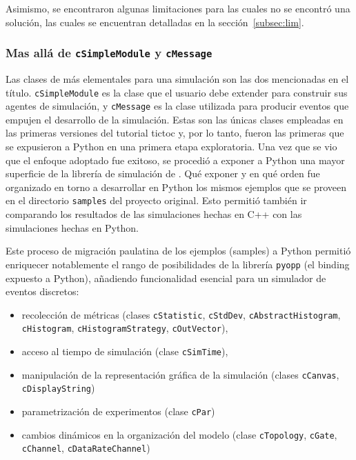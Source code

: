 \documentclass[]{article}
\begin{document}
Asimismo, se encontraron algunas limitaciones para las cuales no se encontró
una solución, las cuales se encuentran detalladas en la
sección~\ref{subsec:lim}.

\subsubsection{Mas allá de \texttt{cSimpleModule} y \texttt{cMessage}}

Las clases de \omnetpp{} más elementales para una simulación son las dos
mencionadas en el título. \verb!cSimpleModule! es la clase que el usuario debe
extender para construir sus agentes de simulación, y \verb!cMessage! es la clase
utilizada para producir eventos que empujen el desarrollo de la simulación.
Estas son las únicas clases empleadas en las primeras versiones del tutorial
tictoc y, por lo tanto, fueron las primeras que se expusieron a Python en una
primera etapa exploratoria. Una vez que se vio que el enfoque adoptado fue
exitoso, se procedió a exponer a Python una mayor superficie de la librería de
simulación de \omnetpp{}. Qué exponer y en qué orden fue organizado en torno a
desarrollar en Python los mismos ejemplos que se proveen en el directorio
\verb!samples! del proyecto original. Esto permitió también ir comparando los
resultados de las simulaciones hechas en C++ con las simulaciones hechas en
Python.

Este proceso de migración paulatina de los ejemplos (samples) a Python permitió
enriquecer notablemente el rango de posibilidades de la librería \verb!pyopp!
(el binding expuesto a Python), añadiendo funcionalidad esencial para un
simulador de eventos discretos:

\begin{itemize}
    \item recolección de métricas (clases \verb!cStatistic!, \verb!cStdDev!,
\verb!cAbstractHistogram!, \verb!cHistogram!, \verb!cHistogramStrategy!,
\verb!cOutVector!),

    \item acceso al tiempo de simulación (clase \verb!cSimTime!),

    \item manipulación de la representación gráfica de la simulación (clases
\verb!cCanvas!, \verb!cDisplayString!)

    \item parametrización de experimentos (clase \verb!cPar!)

    \item cambios dinámicos en la organización del modelo (clase
\verb!cTopology!, \verb!cGate!, \verb!cChannel!, \verb!cDataRateChannel!)
\end{itemize}
\end{document}
